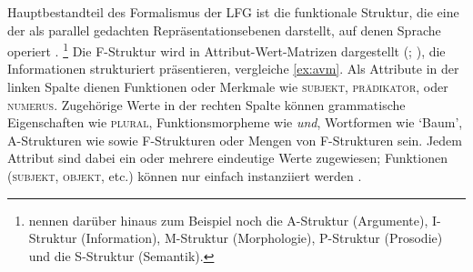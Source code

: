 Hauptbestandteil des Formalismus der LFG ist die funktionale Struktur, die eine
der als parallel gedachten Repräsentationsebenen darstellt, auf denen Sprache
operiert \autocite[840--844]{buttking2015}.%
%
	\footnote{\citet[862--865]{buttking2015} nennen darüber hinaus zum Beispiel
		noch die
		A-Struktur (Argumente),
		I-Struktur (Information),
		M-Struktur (Morphologie),
		P-Struktur (Prosodie)
		und die
		S-Struktur (Semantik).
	}
%
Die F-Struktur wird in Attribut-Wert-Matrizen dargestellt (; \cites[vgl.][44--45]{bresnanetal2016}[Kap.~6]{mueller2020}), die
Informationen strukturiert präsentieren, vergleiche \cref{ex:avm}. Als
Attribute in der linken Spalte dienen Funktionen oder Merkmale wie
\textsc{subjekt}, \textsc{prädikator}, oder \textsc{numerus}.
Zugehörige Werte in der rechten Spalte können grammatische Eigenschaften wie
\textsc{plural}, Funktionsmorpheme wie \textit{und}, Wortformen wie
`Baum', A-Strukturen wie  sowie F-Strukturen oder Mengen von F-Strukturen sein. Jedem
Attribut sind dabei ein oder mehrere eindeutige Werte zugewiesen; Funktionen
(\textsc{subjekt}, \textsc{objekt}, etc.) können nur einfach
instanziiert werden \autocite[vgl.][44--58]{bresnanetal2016}.

